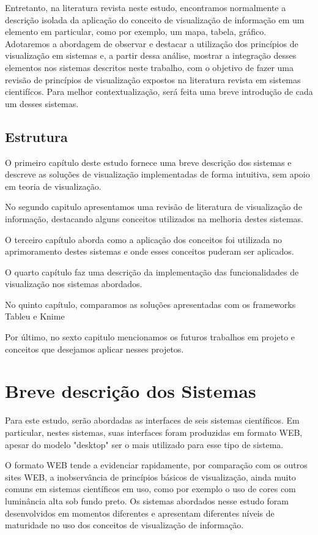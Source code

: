 \documentclass[]{article}
\begin{document}
Entretanto, na literatura revista neste estudo, encontramos normalmente a descrição isolada da aplicação do conceito de visualização de informação em um elemento em particular, como por exemplo, um mapa, tabela, gráfico. Adotaremos a abordagem de  observar e destacar a utilização dos princípios de visualização em sistemas e, a partir dessa análise, mostrar a integração desses elementos nos sistemas descritos neste trabalho, com o objetivo de fazer uma revisão de princípios de visualização expostos na literatura revista em sistemas cientifícos. Para melhor contextualização, será feita uma breve introdução de cada um desses sistemas.

\subsection{Estrutura}

O primeiro capítulo deste estudo fornece uma breve descrição dos sistemas e descreve as soluções de visualização implementadas de forma intuitiva, sem apoio em teoria de visualização.

No segundo capitulo apresentamos uma revisão de literatura de visualização de informação, destacando alguns conceitos utilizados na melhoria destes sistemas.

O terceiro capítulo aborda como a aplicação dos conceitos foi utilizada no aprimoramento destes sistemas e onde esses conceitos puderam ser aplicados.

O quarto capítulo faz uma descrição da implementação das funcionalidades de visualização nos sistemas abordados.

No quinto capítulo, comparamos as soluções apresentadas com os frameworks Tableu e Knime

Por último, no sexto capitulo mencionamos os futuros trabalhos em projeto e conceitos que desejamos aplicar nesses projetos.


\section{Breve descrição dos Sistemas}

Para este estudo, serão abordadas as interfaces de seis sistemas científicos. Em particular, nestes sistemas, suas interfaces foram produzidas em formato WEB, apesar do modelo "desktop" ser o mais utilizado para esse tipo de sistema.

O formato WEB tende a evidenciar rapidamente, por comparação com os outros sites WEB, a inobservância de princípios básicos de visualização, ainda muito comuns em sistemas científicos em uso, como por exemplo o uso de cores com luminância alta sob fundo preto.
Os sistemas abordados nesse estudo foram desenvolvidos em momentos diferentes e apresentam diferentes níveis de maturidade no uso dos conceitos de visualização de informação.
\end{document}

